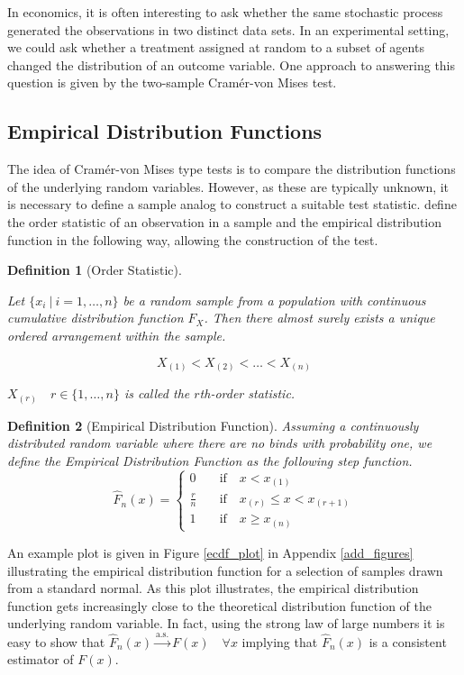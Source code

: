 \documentclass[12pt, a4paper]{article}
\theoremstyle{MAstyle} \newtheorem{assumption}{Assumption}[section]
\theoremstyle{MAstyle} \newtheorem{definition}{Definition}[section]
\theoremstyle{MAstyle} \newtheorem{theorem}{Theorem}[section]
\begin{document}
		In economics, it is often interesting to ask whether the same stochastic process generated the observations in two distinct data sets. In an experimental setting, we could ask whether a treatment assigned at random to a subset of agents changed the distribution of an outcome variable. 
		One approach to answering this question is given by the two-sample Cram\'{e}r-von Mises test.

		\subsection{Empirical Distribution Functions}
			The idea of Cram\'{e}r-von Mises type tests is to compare the distribution functions of the underlying random variables. However, as these are typically unknown, it is necessary to define a sample analog to construct a suitable test statistic.
			\cite{gibbons_nonparametric_2021} define the order statistic of an observation in a sample and the empirical distribution function in the following way, allowing the construction of the test.
			\begin{definition}[Order Statistic]\label{Order_Stat}
				
				Let $\{x_i \: \vert \: i = 1, \dots , n\}$ be a random sample from a population with continuous cumulative distribution function $F_X$. Then there almost surely exists a unique ordered arrangement within the sample. 
				
				$$X_{(1)} < X_{(2)} < \dots < X_{(n)}$$
				
				$X_{(r)} \quad r \in \{1, \dots, n\}$ is called the $r$th-order statistic.	
			\end{definition}
		
			\begin{definition}[Empirical Distribution Function]
				Assuming a continuously distributed random variable where there are no binds with probability one, we define the Empirical Distribution Function as the following step function.
				\begin{equation}
					\hat{F}_{n}(x) = \begin{cases}
						0 & \quad \text{if} \quad  x < x_{(1)} \\
						\frac{r}{n} & \quad \text{if} \quad  x_{(r)} \leq x < x_{(r + 1)} \\
						1 & \quad \text{if} \quad  x \geq x_{(n)}
					\end{cases}
				\end{equation}
			\end{definition}
			An example plot is given in Figure \ref{ecdf_plot} in Appendix \ref{add_figures} illustrating the empirical distribution function for a selection of samples drawn from a standard normal. As this plot illustrates, the empirical distribution function gets increasingly close to the theoretical distribution function of the underlying random variable. In fact, using the strong law of large numbers it is easy to show that $\hat{F}_n(x) \stackrel{\text{a.s.}}{\rightarrow} F(x) \quad  \forall x$ implying that $\hat{F}_n(x)$ is a consistent estimator of $F(x)$.
			
\end{document}
